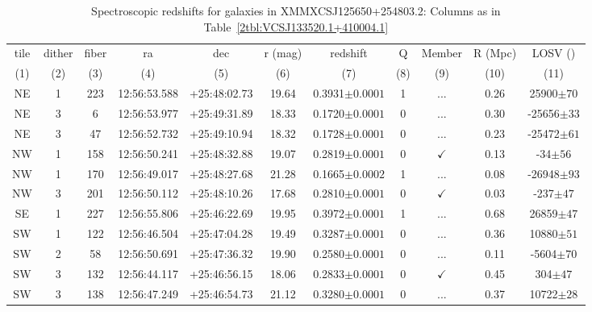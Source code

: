\begin{landscape}
	\begin{table}
		\centering 
		\caption[Spectroscopic redshifts for galaxies in XMMXCSJ125650+254803.2.]{Spectroscopic redshifts for galaxies in XMMXCSJ125650+254803.2: Columns as in Table~\ref{2tbl:VCSJ133520.1+410004.1}}
		\begin{tabular}{ccccccccccc}
			\hline
			tile & dither & fiber & ra & dec & r (mag) & redshift & Q & Member & R (Mpc) & LOSV (\kms) \\
			(1) & (2) & (3) & (4) & (5) & (6) & (7) & (8) & (9) & (10) & (11) \\
			\hline \hline
	NE & 1 & 223 & 12:56:53.588 & +25:48:02.73 & 19.64 & 0.3931$\pm{0.0001}$ & 1 & ... & 0.26 & 25900$\pm{70}$ \\
	NE & 3 & 6 & 12:56:53.977 & +25:49:31.89 & 18.33 & 0.1720$\pm{0.0001}$ & 0 & ... & 0.30 & -25656$\pm{33}$ \\
	NE & 3 & 47 & 12:56:52.732 & +25:49:10.94 & 18.32 & 0.1728$\pm{0.0001}$ & 0 & ... & 0.23 & -25472$\pm{61}$ \\
	NW & 1 & 158 & 12:56:50.241 & +25:48:32.88 & 19.07 & 0.2819$\pm{0.0001}$ & 0 & $\checkmark$ & 0.13 & -34$\pm{56}$ \\
	NW & 1 & 170 & 12:56:49.017 & +25:48:27.68 & 21.28 & 0.1665$\pm{0.0002}$ & 1 & ... & 0.08 & -26948$\pm{93}$ \\
	NW & 3 & 201 & 12:56:50.112 & +25:48:10.26 & 17.68 & 0.2810$\pm{0.0001}$ & 0 & $\checkmark$ & 0.03 & -237$\pm{47}$ \\
	SE & 1 & 227 & 12:56:55.806 & +25:46:22.69 & 19.95 & 0.3972$\pm{0.0001}$ & 1 & ... & 0.68 & 26859$\pm{47}$ \\
	SW & 1 & 122 & 12:56:46.504 & +25:47:04.28 & 19.49 & 0.3287$\pm{0.0001}$ & 0 & ... & 0.36 & 10880$\pm{51}$ \\
	SW & 2 & 58 & 12:56:50.691 & +25:47:36.32 & 19.90 & 0.2580$\pm{0.0001}$ & 0 & ... & 0.11 & -5604$\pm{70}$ \\
	SW & 3 & 132 & 12:56:44.117 & +25:46:56.15 & 18.06 & 0.2833$\pm{0.0001}$ & 0 & $\checkmark$ & 0.45 & 304$\pm{47}$ \\
	SW & 3 & 138 & 12:56:47.249 & +25:46:54.73 & 21.12 & 0.3280$\pm{0.0001}$ & 0 & ... & 0.37 & 10722$\pm{28}$ \\
			\hline
		\end{tabular}
		\label{2tbl:XMMXCSJ125650+254803.2}
	\end{table}
\end{landscape}

